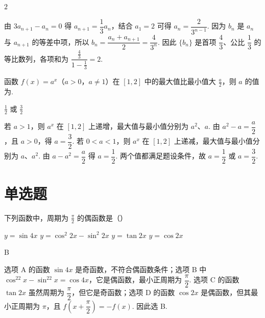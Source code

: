 \documentclass[UTF8,a4paper,oneside,11pt]{ctexbook}
\begin{document}
\begin{answer}
\(2\)
\end{answer}

\begin{solution}
由 \(3a_{n+1}-a_n=0\) 得 \(a_{n+1}=\dfrac13a_n\)，结合 \(a_1=2\) 可得 \(a_n=\dfrac{2}{3^{n-1}}\). 因为 \(b_n\) 是 \(a_n\) 与 \(a_{n+1}\) 的等差中项，所以 \(b_n=\dfrac{a_n+a_{n+1}}2=\dfrac{4}{3^n}\). 因此 \(\{b_n\}\) 是首项 \(\dfrac43\)、公比 \(\dfrac13\) 的等比数列，各项和为 \(\dfrac{\frac43}{1-\frac13}=2\).
\end{solution}

\begin{problem}
函数 \(f(x)=a^{x}\)（\(a>0\)，\(a\neq1\)）在 \([1,2] \) 中的最大值比最小值大 \(\frac{a}{2} \)，则 \(a\) 的值为\fillinblank{}.
\end{problem}

\begin{answer}
\(\frac{1}{2}\) 或 \(\frac{3}{2}\)
\end{answer}

\begin{solution}
若 \(a>1\)，则 \(a^x\) 在 \([1,2]\) 上递增，最大值与最小值分别为 \(a^2\)、\(a\). 由 \(a^2-a=\dfrac a2\)，且 \(a>0\)，得 \(a=\dfrac32\). 若 \(0<a<1\)，则 \(a^x\) 在 \([1,2]\) 上递减，最大值与最小值分别为 \(a\)、\(a^2\). 由 \(a-a^2=\dfrac a2\) 得 \(a=\dfrac12\). 两个值都满足题设条件，故 \(a=\dfrac12\) 或 \(a=\dfrac32\).
\end{solution}

\section{单选题}

\begin{problem}
下列函数中，周期为 \(\frac{\pi}{2}\) 的偶函数是（\quad）

\choices
    {\(y = \sin 4x \)}
    {\(y = \cos^{2}2x - \sin^{2}2x \)}
    {\(y = \tan 2x \)}
    {\(y = \cos 2x \)}
\end{problem}

\begin{answer}
B
\end{answer}

\begin{solution}
选项 A 的函数 \(\sin4x\) 是奇函数，不符合偶函数条件；选项 B 中 \(\cos^22x-\sin^22x=\cos4x\)，它是偶函数，最小正周期为 \(\dfrac\pi2\). 选项 C 的函数 \(\tan2x\) 虽然周期为 \(\dfrac\pi2\)，但它是奇函数；选项 D 的函数 \(\cos2x\) 是偶函数，但其最小正周期为 \(\pi\)，且 \(f\left(x+\dfrac\pi2\right)=-f(x)\). 因此选 B.
\end{solution}
\end{document}
